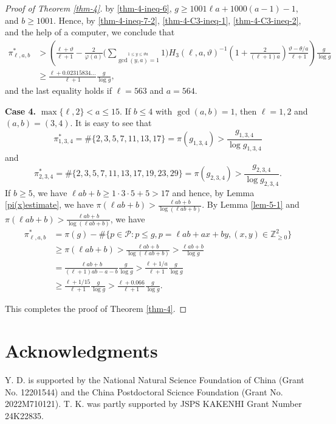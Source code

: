 \documentclass[12pt,a4paper,reqno]{amsart}
\numberwithin{equation}{section}
\def\Z{{\mathbb Z}}
\def\cP{{\mathcal P}}
\theoremstyle{plain}
\theoremstyle{definition}
\begin{document}
\begin{proof}[Proof of Theorem \ref{thm-4}]
 by \eqref{thm-4-ineq-6}, $g\geq 1001\ell a+1000(a-1)-1$, and $b\geq 1001$. Hence, by \eqref{thm-4-ineq-7-2}, \eqref{thm-4-C3-ineq-1}, \eqref{thm-4-C3-ineq-2}, and the help of a computer, we conclude that
 \begin{align*}
 	\pi^{*}_{\ell,a,b} 
 	&>\left( 
 	\frac{\ell+\vartheta}{\ell+1}
 	-\frac{2}{\varphi(a)}
 	\Bigg(\sum_{\stackrel{1\leq y\leq \vartheta a}{\gcd(y,a)=1}}1
 	\Bigg)
 	H_{3}(\ell,a,\vartheta)^{-1}
 \left( 1+\frac{2}{(\ell+1)a} \right)
 \frac{\vartheta-\theta/a}{\ell+1}
 	\right)  \frac{g}{\log g}\\
 	&\geq \frac{\ell+0.02315834\ldots}{\ell+1}\frac{g}{\log g},
 \end{align*}
 and the last equality holds if $\ell=563$ and $a=564$.
 
  \textbf{Case 4.} $\max\{\ell,2\} <a\leq 15$. If $b\leq 4$ with $\gcd(a,b)=1$, then $\ell=1,2$ and $(a,b)=(3,4)$. It is easy to see that
  \begin{equation*}
  	\pi_{1,3,4}^{*}
  	=\#\{2,3,5,7,11,13,17\}
  	=\pi(g_{1,3,4})
  	>\frac{g_{1,3,4}}{\log g_{1,3,4}}
  \end{equation*}
  and
  \begin{equation*}
  	\pi_{2,3,4}^{*}=\#\{2,3,5,7,11,13,17,19,23,29\}=\pi(g_{2,3,4})>\frac{g_{2,3,4}}{\log g_{2,3,4}}.
  \end{equation*}
   If $b\geq 5$, we have $\ell ab+b\geq 1\cdot 3\cdot 5+5> 17$ and hence, by Lemma \ref{pi(x)estimate}, we have $\pi(\ell ab+b)>\frac{\ell ab+b}{\log(\ell ab+b)}$. By Lemma \ref{lem-5-1} and $\pi(\ell ab+b)>\frac{\ell ab+b}{\log(\ell ab+b)}$, we have
  \begin{align*}
  	\pi_{\ell,a,b}^{*}
  	&=\pi(g)-\#\{p\in\cP: p\leq g, p=\ell ab+ax+by,(x,y)\in\Z_{\geq 0}^{2}\}\nonumber\\
  	&\geq \pi(\ell ab+b)
  	> \frac{\ell ab+b}{\log(\ell ab+b)}
  	> \frac{\ell ab+b}{\log g}\nonumber\\
  	&= \frac{\ell ab+b}{(\ell+1) ab-a-b}\frac{g}{\log g}>\frac{\ell+1/a}{\ell+1}\frac{g}{\log g}\nonumber\\
  	&\geq \frac{\ell+1/15}{\ell+1}\frac{g}{\log g}
  	> \frac{\ell+0.066}{\ell+1}\frac{g}{\log g}.
  \end{align*}
  
  This completes the proof of Theorem \ref{thm-4}.
\end{proof}

	\section*{Acknowledgments}
Y. D. is supported by the National Natural Science Foundation of China (Grant No.
12201544) and the China Postdoctoral Scicnce Foundation (Grant No. 2022M710121). T. K. was partly supported by JSPS KAKENHI Grant Number 24K22835.
\end{document}
